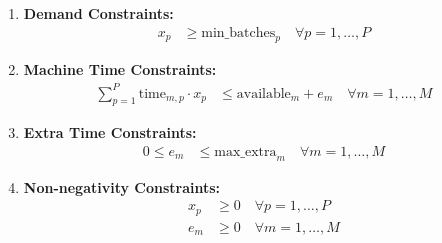 \documentclass{article}
\begin{document}
\begin{enumerate}
    \item \textbf{Demand Constraints:}
    \begin{align*}
    x_p &\geq \text{min\_batches}_p \quad \forall p = 1, \ldots, P
    \end{align*}
    
    \item \textbf{Machine Time Constraints:}
    \begin{align*}
    \sum_{p=1}^{P} \text{time}_{m,p} \cdot x_p &\leq \text{available}_m + e_m \quad \forall m = 1, \ldots, M
    \end{align*}
    
    \item \textbf{Extra Time Constraints:}
    \begin{align*}
    0 \leq e_m &\leq \text{max\_extra}_m \quad \forall m = 1, \ldots, M
    \end{align*}
    
    \item \textbf{Non-negativity Constraints:}
    \begin{align*}
    x_p &\geq 0 \quad \forall p = 1, \ldots, P \\
    e_m &\geq 0 \quad \forall m = 1, \ldots, M
    \end{align*}
\end{enumerate}
\end{document}

